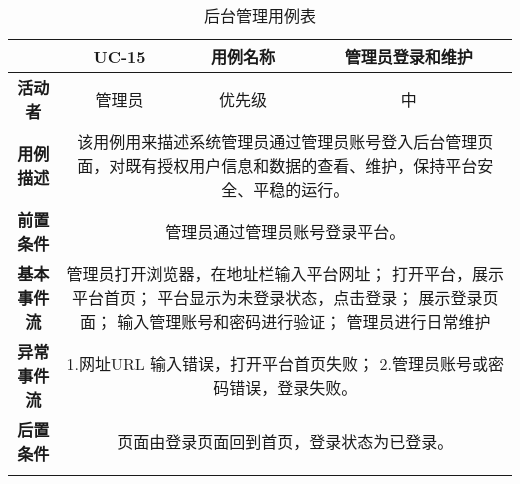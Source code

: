 \begin{longtable}[c]{c|ccc}
	\caption{后台管理用例表}
	\label{tab:tab15}\\
	\shline
	\multicolumn{1}{c|}{\textbf{用例编号}} & \multicolumn{1}{c|}{UC-15} & \multicolumn{1}{c|}{用例名称} &  管理员登录和维护\\ \hline
	\endhead
	\multicolumn{1}{c|}{\textbf{活动者}} & \multicolumn{1}{c|}{管理员} & \multicolumn{1}{c|}{优先级} &中  \\ \hline
	\textbf{用例描述} & \multicolumn{3}{p{12cm}}{该用例用来描述系统管理员通过管理员账号登入后台管理页面，对既有授权用户信息和数据的查看、维护，保持平台安全、平稳的运行。} \\ \hline
	\textbf{前置条件}& \multicolumn{3}{p{12cm}}{管理员通过管理员账号登录平台。} \\ \hline
	\textbf{基本事件流}& \multicolumn{3}{p{12cm}}{管理员打开浏览器，在地址栏输入平台网址；\newline
		打开平台，展示平台首页；\newline
		平台显示为未登录状态，点击登录；\newline
		展示登录页面；\newline
		输入管理账号和密码进行验证；\newline
		管理员进行日常维护} \\ \hline
	\textbf{异常事件流}& \multicolumn{3}{p{12cm}}{1.网址URL 输入错误，打开平台首页失败；\newline
		2.管理员账号或密码错误，登录失败。
	} \\ \hline
	\textbf{后置条件}& \multicolumn{3}{p{12cm}}{页面由登录页面回到首页，登录状态为已登录。} \\ \shline
\end{longtable}